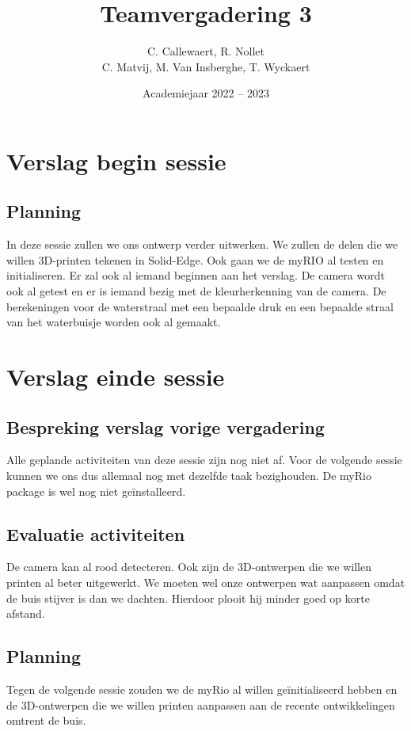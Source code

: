\documentclass{kulakarticle}
\title{Teamvergadering 3}
\author{C. Callewaert, R. Nollet \\
	C. Matvij, M. Van Insberghe, T. Wyckaert }
\date{Academiejaar 2022 -- 2023}
\begin{document}
	\maketitle
	\section{Verslag begin sessie}
	

	
	\subsection{Planning}
	In deze sessie zullen we ons ontwerp verder uitwerken. We zullen de delen die we willen 3D-printen tekenen in Solid-Edge. Ook gaan we de myRIO al testen en initialiseren.  Er zal ook al iemand beginnen aan het verslag. De camera wordt ook al getest en er is iemand bezig met de kleurherkenning van de camera. De berekeningen voor de waterstraal met een bepaalde druk en een bepaalde straal van het waterbuisje worden ook al gemaakt. 



	
	\section{Verslag einde sessie}
	
\subsection{Bespreking verslag vorige vergadering}
Alle geplande activiteiten van deze sessie zijn nog niet af. Voor de volgende sessie kunnen we ons dus allemaal nog met dezelfde taak bezighouden. De myRio package is wel nog niet geïnstalleerd.

\subsection{Evaluatie activiteiten}
De camera kan al rood detecteren. Ook zijn de 3D-ontwerpen die we willen printen al beter uitgewerkt. We moeten wel onze ontwerpen wat aanpassen omdat de buis stijver is dan we dachten. Hierdoor plooit hij minder goed op korte afstand.
\subsection{Planning}
Tegen de volgende sessie zouden we de myRio al willen geïnitialiseerd hebben en de 3D-ontwerpen die we willen printen aanpassen aan de recente ontwikkelingen omtrent de buis.

	

	
\end{document}
